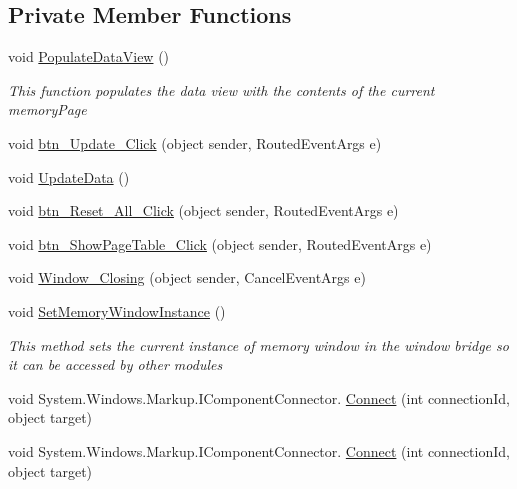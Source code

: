 \subsection*{Private Member Functions}
\begin{DoxyCompactItemize}
\item 
void \hyperlink{class_c_p_u___o_s___simulator_1_1_memory_window_a8811287064d6315e3a8c01531148ed81}{Populate\+Data\+View} ()
\begin{DoxyCompactList}\small\item\em This function populates the data view with the contents of the current memory\+Page \end{DoxyCompactList}\item 
void \hyperlink{class_c_p_u___o_s___simulator_1_1_memory_window_a91ec1c8081b85d3c07eaa31ee524f5d9}{btn\+\_\+\+Update\+\_\+\+Click} (object sender, Routed\+Event\+Args e)
\item 
void \hyperlink{class_c_p_u___o_s___simulator_1_1_memory_window_ab0cb156466262b3d90f19acd422dc65b}{Update\+Data} ()
\item 
void \hyperlink{class_c_p_u___o_s___simulator_1_1_memory_window_ac77beff86f4dd6322bdcf2430892d2aa}{btn\+\_\+\+Reset\+\_\+\+All\+\_\+\+Click} (object sender, Routed\+Event\+Args e)
\item 
void \hyperlink{class_c_p_u___o_s___simulator_1_1_memory_window_a0540a495053120e2572a106dbbc391de}{btn\+\_\+\+Show\+Page\+Table\+\_\+\+Click} (object sender, Routed\+Event\+Args e)
\item 
void \hyperlink{class_c_p_u___o_s___simulator_1_1_memory_window_a0727fbff3ea42722692b224a621ecc4a}{Window\+\_\+\+Closing} (object sender, Cancel\+Event\+Args e)
\item 
void \hyperlink{class_c_p_u___o_s___simulator_1_1_memory_window_a5100fa341de6de08d11967198cd82208}{Set\+Memory\+Window\+Instance} ()
\begin{DoxyCompactList}\small\item\em This method sets the current instance of memory window in the window bridge so it can be accessed by other modules \end{DoxyCompactList}\item 
void System.\+Windows.\+Markup.\+I\+Component\+Connector. \hyperlink{class_c_p_u___o_s___simulator_1_1_memory_window_aba65e66795c99052ebed93162110e908}{Connect} (int connection\+Id, object target)
\item 
void System.\+Windows.\+Markup.\+I\+Component\+Connector. \hyperlink{class_c_p_u___o_s___simulator_1_1_memory_window_aba65e66795c99052ebed93162110e908}{Connect} (int connection\+Id, object target)
\end{DoxyCompactItemize}
